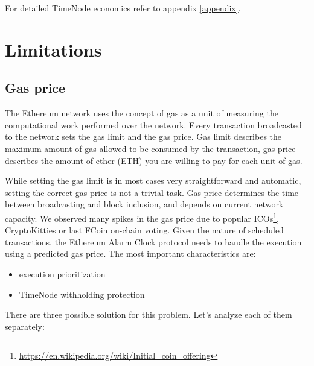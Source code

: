 \documentclass{report}
\begin{document}
  For detailed TimeNode economics refer to appendix \ref{appendix}.
  \section{Limitations}
  \subsection{Gas price}
  The Ethereum network uses the concept of gas as a unit of measuring the computational work performed over the network. Every transaction broadcasted to the network sets the gas limit and the gas price. Gas limit describes the maximum amount of gas allowed to be consumed by the transaction, gas price describes the amount of ether (ETH) you are willing to pay for each unit of gas.

  While setting the gas limit is in most cases very straightforward and automatic, setting the correct gas price is not a trivial task. Gas price determines the time between broadcasting and block inclusion, and depends on current network capacity. We observed many spikes in the gas price due to popular ICOs\footnote{\url{https://en.wikipedia.org/wiki/Initial_coin_offering}}, CryptoKitties or last FCoin on-chain voting.
Given the nature of scheduled transactions, the Ethereum Alarm Clock protocol needs to handle the execution using a predicted gas price. The most important characteristics are:
  \begin{itemize}
    \item execution prioritization
    \item TimeNode withholding protection
  \end{itemize}

  There are three possible solution for this problem. Let's analyze each of them separately:
\end{document}
